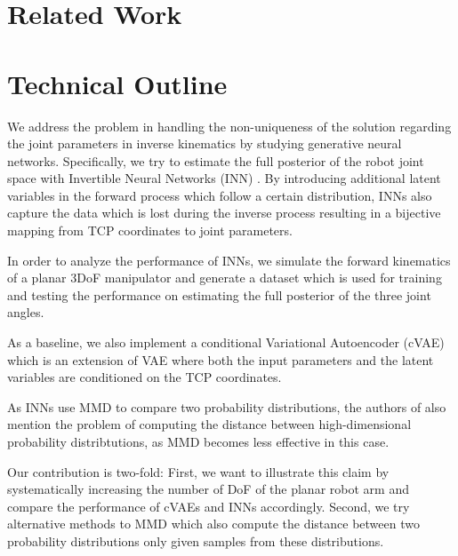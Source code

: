 \documentclass[12pt]{extarticle}
\begin{document}
\section*{Related Work}

\section*{Technical Outline}

We address the problem in handling the non-uniqueness of the solution regarding the joint parameters in inverse kinematics by studying generative neural networks. Specifically, we try to estimate the full posterior of the robot joint space with Invertible Neural Networks (INN) \cite{Ardizzone2018}. By introducing additional latent variables in the forward process which follow a certain distribution, INNs also capture the data which is lost during the inverse process resulting in a bijective mapping from TCP coordinates to joint parameters.

In order to analyze the performance of INNs, we simulate the forward kinematics of a planar 3DoF manipulator and generate a dataset which is used for training and testing the performance on estimating the full posterior of the three joint angles.

As a baseline, we also implement a conditional Variational Autoencoder (cVAE) \cite{Sohn2015} which is an extension of VAE where both the input parameters and the latent variables are conditioned on the TCP coordinates.

As INNs use MMD to compare two probability distributions, the authors of \cite{Ardizzone2018} also mention the problem of computing the distance between high-dimensional probability distribtutions, as MMD becomes less effective in this case.

Our contribution is two-fold: First, we want to illustrate this claim by systematically increasing the number of DoF of the planar robot arm and compare the performance of cVAEs and INNs accordingly. Second, we try alternative methods to MMD which also compute the distance between two probability distributions only given samples from these distributions.



\end{document}
